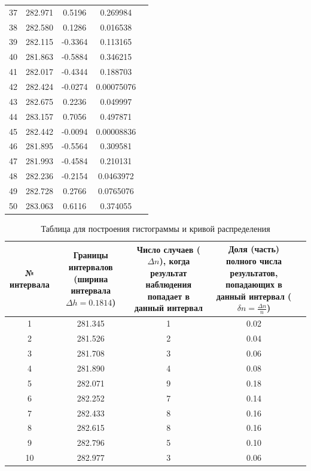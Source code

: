 \begin{center}
\begin{table}[h!]
\begin{tabular}{|c|c|c|c|c|}
37& 282.971  &	0.5196 & 0.269984 \\
38& 282.580  &	0.1286 & 0.016538 \\
39& 282.115  &	-0.3364 & 0.113165 \\
40& 281.863  &	-0.5884 & 0.346215 \\
41& 282.017  &	-0.4344 & 0.188703 \\
42& 282.424  &	-0.0274 & 0.00075076 \\
43& 282.675  &	0.2236 & 0.049997 \\
44& 283.157  &	0.7056 & 0.497871 \\
45& 282.442  &	-0.0094 & 0.00008836 \\
46& 281.895  &	-0.5564 & 0.309581 \\
47& 281.993  &	-0.4584 & 0.210131 \\
48& 282.236  &	-0.2154 & 0.0463972 \\
49& 282.728  &	0.2766 & 0.0765076 \\
50& 283.063  &	0.6116 & 0.374055 \\
\hline
\end{tabular}
\end{table}
\end{center}

\begin{table}[h!]
\centering
\caption{Таблица для построения гистограммы и кривой распределения}
\label{tabl:1}
\begin{tabular}{|c|c|c|c|c|}
\hline
\begin{minipage}{7mm}
    № интервала 
\end{minipage}&
\begin{minipage}{5cm}
    Границы интервалов (ширина интервала $\Delta h = 0.1814$)
\end{minipage} & 
\begin{minipage}{5cm}
    Число случаев ($\Delta n$), когда результат наблюдения попадает в данный интервал
\end{minipage} & 
\begin{minipage}{5cm}
    Доля (часть) полного числа результатов, попадающих в данный интервал ($\delta n = \frac{\Delta n}{n}$)
\end{minipage}\\
\hline
1 &  281.345 & 1 &  0.02\\
2 &  281.526 & 2 & 0.04 \\
3 &  281.708 & 3 & 0.06 \\
4 &  281.890 & 4 & 0.08 \\
5 & 282.071 & 9 & 0.18 \\
6 & 282.252 & 7 & 0.14 \\
7 & 282.433 & 8 & 0.16 \\
8 & 282.615 & 8 & 0.16 \\
9 & 282.796 & 5 & 0.10 \\
10& 282.977 & 3 &  0.06 \\
\hline
\end{tabular}
\end{table}

